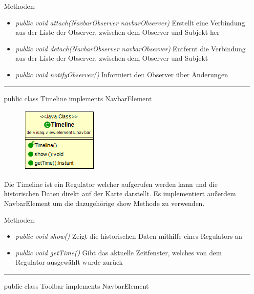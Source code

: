 Methoden:
\begin{itemize} 
    \item \emph{public void attach(NavbarObserver navbarObserver)} Erstellt eine Verbindung aus der Liste der Observer, zwischen dem Observer und Subjekt her
    \item \emph{public void detach(NavbarObserver navbarObserver)} Entfernt die Verbindung aus der Liste der Observer, zwischen dem Observer und Subjekt
    \item \emph{public void notifyObserver()} Informiert den Observer über Änderungen
\end{itemize}


\rule{\textwidth}{0.4pt} 
public class Timeline implements NavbarElement

\begin{minipage}{0.3\textwidth}
    \begin{figure}[H]
        \includegraphics[scale = 0.7]{media/frontend/view/de.view.elements.navbar/TimelineClass.png}
    \end{figure}
    \end{minipage} \hfill
\begin{minipage}{0.6\textwidth}
Die Timeline ist ein Regulator welcher aufgerufen werden kann und die historischen Daten direkt auf der Karte darstellt. Es implementiert außerdem NavbarElement um die dazugehörige show Methode zu verwenden.
\end{minipage}

Methoden:
\begin{itemize} 
    \item \emph{public void show()} Zeigt die historischen Daten mithilfe eines Regulators an 
    \item \emph{public void getTime()} Gibt das aktuelle Zeitfenster, welches von dem Regulator ausgewählt wurde zurück
\end{itemize}

\rule{\textwidth}{0.4pt} 
public class Toolbar implements NavbarElement


